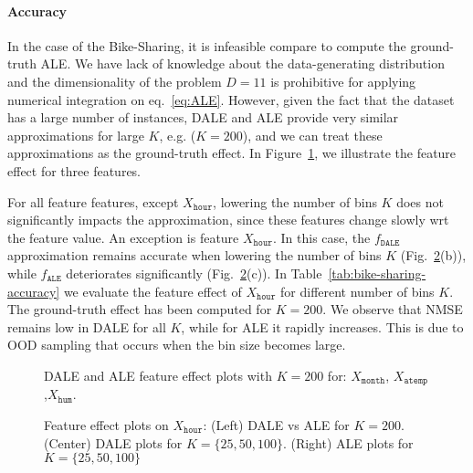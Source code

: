 \paragraph{Accuracy}

In the case of the Bike-Sharing, it is infeasible compare to compute
the ground-truth ALE. We have lack of knowledge about the
data-generating distribution and the dimensionality of the problem
\(D=11\) is prohibitive for applying numerical integration on
eq.~\eqref{eq:ALE}. However, given the fact that the dataset has a
large number of instances, DALE and ALE provide very similar
approximations for large \(K\), e.g. (\(K=200\)), and we can treat
these approximations as the ground-truth effect. In
Figure~\ref{fig:bike-sharing-comparison}, we illustrate the feature
effect for three features.

For all feature features, except \(X_{\mathtt{hour}}\), lowering the
number of bins \(K\) does not significantly impacts the approximation,
since these features change slowly wrt the feature value. An exception
is feature \(X_{\mathtt{hour}}\). In this case, the
\(f_{\mathtt{DALE}}\) approximation remains accurate when lowering the
number of bins \(K\) (Fig.~\ref{fig:bike-sharing-feature-3}(b)), while
\(\hat{f}_{\mathtt{ALE}}\) deteriorates significantly
(Fig.~\ref{fig:bike-sharing-feature-3}(c)). In
Table~\ref{tab:bike-sharing-accuracy} we evaluate the feature effect
of \(X_{\mathtt{hour}}\) for different number of bins \(K\). The
ground-truth effect has been computed for \(K=200\). We observe that
NMSE remains low in DALE for all \(K\), while for ALE it rapidly
increases. This is due to OOD sampling that occurs when the bin size
becomes large.


\begin{figure}[h]
  \centering
  \resizebox{.3\columnwidth}{!}{}
  \resizebox{.3\columnwidth}{!}{}
  \resizebox{.3\columnwidth}{!}{}
  \caption{DALE and ALE feature effect plots with \(K=200\) for:
    \(X_{\texttt{month}}\), \(X_{\mathtt{atemp}}\),\(X_{\mathtt{hum}}\).}
  \label{fig:bike-sharing-comparison}
\end{figure}


\begin{figure}[h]
  \centering
    \resizebox{.3\columnwidth}{!}{}
    \resizebox{.3\columnwidth}{!}{}
    \resizebox{.3\columnwidth}{!}{}
    \caption{Feature effect plots on \(X_{\texttt{hour}}\): (Left)
      DALE vs ALE for \(K=200\). (Center) DALE plots for
      \(K = \{25, 50, 100\}\). (Right) ALE plots for
      \(K = \{25, 50, 100\}\)}
  \label{fig:bike-sharing-feature-3}
\end{figure}


